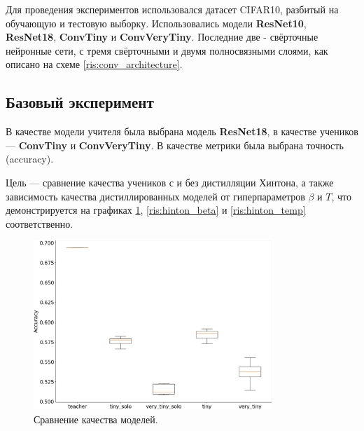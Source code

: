 \documentclass[14]{article}
\begin{document}
Для проведения экспериментов использовался датасет CIFAR10, разбитый на обучающую и тестовую выборку.
Использовались модели \textbf{ResNet10}, \textbf{ResNet18}, \textbf{ConvTiny} и \textbf{ConvVeryTiny}.
Последние две - свёрточные нейронные сети, с тремя свёрточными и двумя полносвязными слоями, как описано на схеме \ref{ris:conv_architecture}.


\subsection{Базовый эксперимент}

В качестве модели учителя была выбрана модель \textbf{ResNet18},
в качестве учеников --- \textbf{ConvTiny} и \textbf{ConvVeryTiny}.
В качестве метрики была выбрана точность (accuracy).

Цель --- сравнение качества учеников с и без дистилляции Хинтона, а также зависимость качества
дистиллированных моделей от гиперпараметров $\beta$ и $T$, что демонстрируется на графиках \ref{ris:hinton_box},
\ref{ris:hinton_beta} и \ref{ris:hinton_temp} соответственно.

\begin{figure}[h]
  \includegraphics[width=9cm]{../figures/box_hinton_model_accuracy.png}
  \centering
  \caption{Сравнение качества моделей.}
  \label{ris:hinton_box}
\end{figure}
\end{document}
